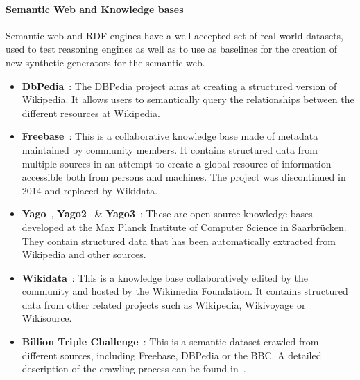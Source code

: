 \paragraph{Semantic Web and Knowledge bases}

Semantic web and RDF engines have a well accepted set of real-world datasets, used to
test reasoning engines as well as to use as baselines for the creation of new
synthetic generators for the semantic web.

\begin{itemize}
  \item \textbf{DbPedia}~\cite{Bizer:2009:DCP:1640541.1640848}: The DBPedia project aims at creating
    a structured version of Wikipedia. It allows users to semantically query the
    relationships between the different resources at Wikipedia.
  \item \textbf{Freebase}~\cite{bollacker2008freebase}: This is a collaborative knowledge base
    made of metadata maintained by community members. It contains
    structured data from multiple sources in an attempt to create a global
    resource of information accessible both from persons and machines. The
    project was discontinued in 2014 and replaced by Wikidata.
  \item \textbf{Yago}~\cite{suchanek2007yago}, \textbf{Yago2}~\cite{hoffart2013yago2} \&
    \textbf{Yago3}~\cite{mahdisoltani2013yago3}: These are
    open source knowledge bases developed at the Max Planck Institute of
    Computer Science in Saarbr\"ucken. They contain structured data  that has been automatically extracted
    from Wikipedia and other sources.
  \item \textbf{Wikidata}~\cite{vrandevcic2014wikidata}: This is a knowledge base
    collaboratively edited by the community and hosted by the Wikimedia
    Foundation. It contains structured data from other related projects such as Wikipedia,
    Wikivoyage or Wikisource.
  \item \textbf{Billion Triple Challenge}~\cite{btc-2014}: This is a semantic dataset
    crawled from different sources, including Freebase, DBPedia or the BBC. A
    detailed description of the crawling process can be found in~\cite{kafer2012towards}.
\end{itemize}

